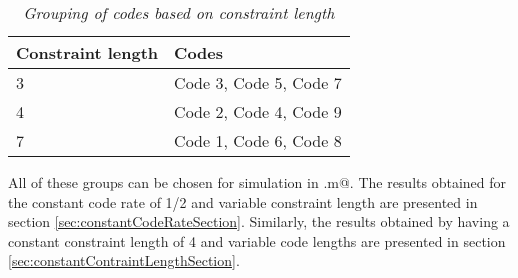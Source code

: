 \begin{table}[h]
\centering
\begin{tabular}{ll}
\hline
Constraint length &  Codes \\ \hline
3 & Code 3, Code 5, Code 7 \\
4 & Code 2, Code 4, Code 9 \\
7 & Code 1, Code 6, Code 8 \\
\end{tabular}
\caption{\textit{Grouping of codes based on constraint length}\label{tab:constraintLength}}
\end{table}
All of these groups can be chosen for simulation in \verb@trellisGenerator.m@. The results obtained for the constant code rate of 1/2 and variable constraint length are presented in section \ref{sec:constantCodeRateSection}. Similarly, the results obtained by having a constant constraint length of 4 and variable code lengths are presented in section \ref{sec:constantContraintLengthSection}.